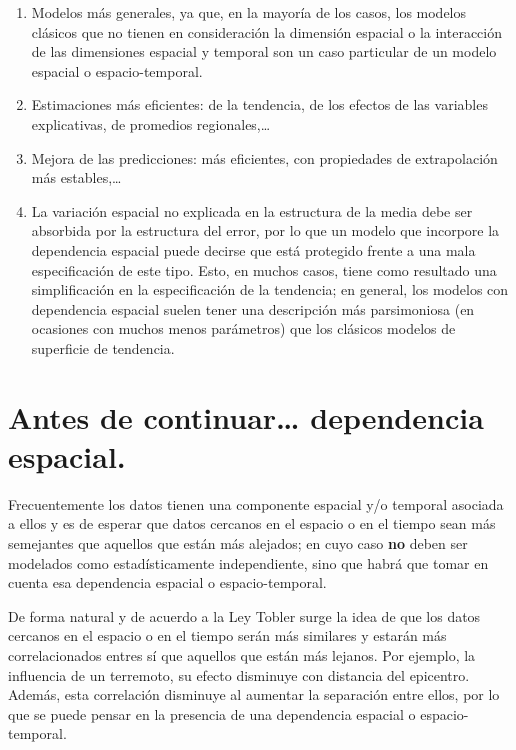 \documentclass[
]{book}
\theoremstyle{definition}
\theoremstyle{definition}
\theoremstyle{definition}
\theoremstyle{definition}
\theoremstyle{remark}
\begin{document}
\begin{enumerate}
\def\labelenumi{\arabic{enumi}.}
\item
  Modelos más generales, ya que, en la mayoría de los casos, los modelos
  clásicos que no tienen en consideración la dimensión espacial o la
  interacción de las dimensiones espacial y temporal son un caso particular de
  un modelo espacial o espacio-temporal.
\item
  Estimaciones más eficientes: de la tendencia, de los efectos de las
  variables explicativas, de promedios regionales,\ldots{}
\item
  Mejora de las predicciones: más eficientes, con propiedades de extrapolación
  más estables,\ldots{}
\item
  La variación espacial no explicada en la estructura de la media debe ser
  absorbida por la estructura del error, por lo que un modelo que incorpore la
  dependencia espacial puede decirse que está protegido frente a una mala
  especificación de este tipo. Esto, en muchos casos, tiene como resultado una
  simplificación en la especificación de la tendencia; en general, los modelos
  con dependencia espacial suelen tener una descripción más parsimoniosa (en
  ocasiones con muchos menos parámetros) que los clásicos modelos de
  superficie de tendencia.
\end{enumerate}

\hypertarget{antes-de-continuar-dependencia-espacial.}{%
\section{Antes de continuar\ldots{} dependencia espacial.}\label{antes-de-continuar-dependencia-espacial.}}

Frecuentemente los datos tienen una componente espacial y/o temporal asociada a
ellos y es de esperar que datos cercanos en el espacio o en el tiempo sean más
semejantes que aquellos que están más alejados; en cuyo caso \textbf{no} deben ser
modelados como estadísticamente independiente, sino que habrá que tomar en
cuenta esa dependencia espacial o espacio-temporal.

De forma natural y de acuerdo a la Ley Tobler \citep{tobler1970} surge la idea de que
los datos cercanos en el espacio o en el tiempo serán más similares y estarán
más correlacionados entres sí que aquellos que están más lejanos. Por ejemplo,
la influencia de un terremoto, su efecto disminuye con distancia del epicentro.
Además, esta correlación disminuye al aumentar la separación entre ellos, por lo
que se puede pensar en la presencia de una dependencia espacial o
espacio-temporal.
\end{document}
